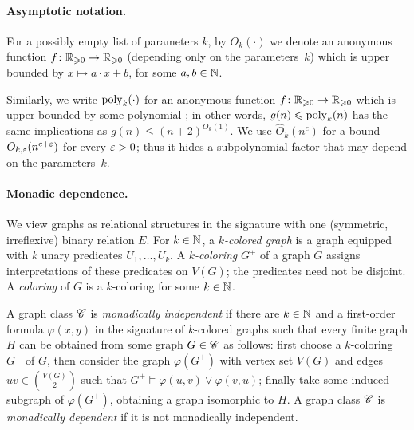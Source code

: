\paragraph{Asymptotic notation.}
For a possibly empty list of parameters $k$, 
 by $O_k(\cdot)$ we denote
 an anonymous function $f\colon \mathbb R_{\geqslant 0}\to \mathbb R_{\geqslant 0}$ (depending only on the parameters~$k$) which is upper bounded by $x\mapsto a\cdot x+b$, for some $a,b\in\mathbb N$.



Similarly, we write $\mathrm{poly}_k(\cdot)$ for an anonymous function $f\colon \mathbb R_{\geqslant 0}\to \mathbb R_{\geqslant 0}$ which is upper bounded by some polynomial%
;
in other words, $g(n)\leqslant \mathrm{poly}_k(n)$ has the same implications as $g(n)\le (n+2)^{O_k(1)}$.
We use $\widehat O_k(n^c)$ for a bound $O_{k,\varepsilon}(n^{c+\varepsilon})$ for every $\varepsilon>0$; thus it hides a subpolynomial factor that may depend on the parameters~$k$.


\paragraph{Monadic dependence.} We view graphs as relational structures in the signature with one (symmetric, irreflexive) binary relation $E$.
For $k\in\mathbb N$, a \emph{$k$-colored graph} is a graph equipped with $k$ unary predicates $U_1,\ldots,U_k$.
A \emph{$k$-coloring} $G^+$ of a graph $G$ assigns interpretations of these predicates on $V(G)$; the predicates need not be disjoint.
A \emph{coloring} of $G$ is a $k$-coloring for some $k\in\mathbb N$.

A graph class $\mathscr C$ is \emph{monadically independent} if there are $k\in\mathbb N$ and a first-order formula $\varphi(x,y)$ in the signature of $k$-colored graphs such that  every finite graph $H$ can be obtained from some graph $G\in\mathscr C$ as follows: first choose a $k$-coloring $G^+$ of $G$, then consider the graph $\varphi(G^+)$ with vertex set $V(G)$ and edges $uv\in\binom{V(G)}2$ such that $G^+\models\varphi(u,v)\vee\varphi(v,u)$; finally take some induced subgraph of $\varphi(G^+)$, obtaining a graph isomorphic to $H$.
A graph class $\mathscr C$ is \emph{monadically dependent} if it is not monadically independent.

